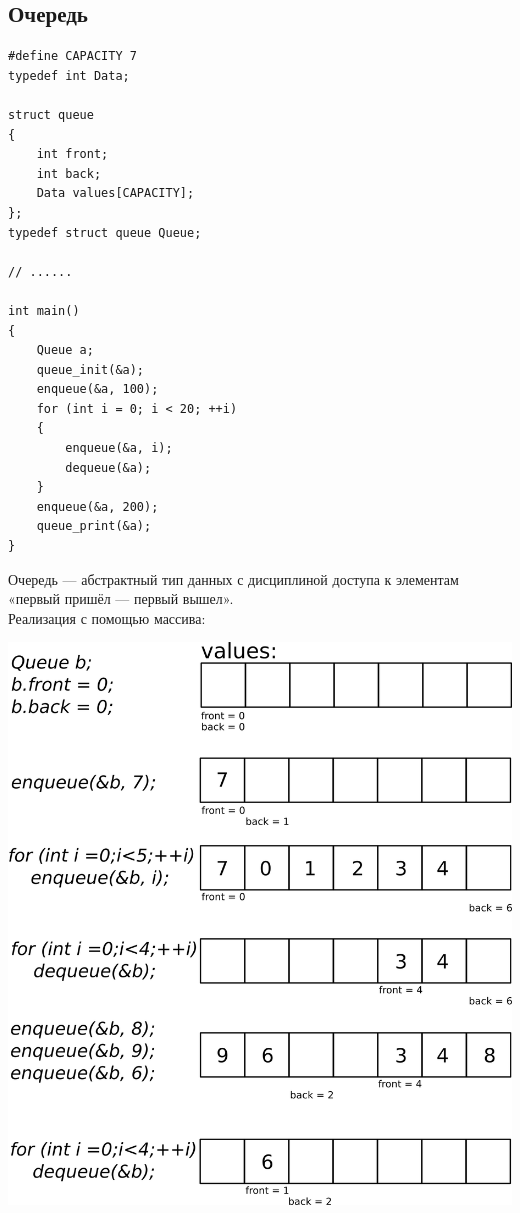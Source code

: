 \documentclass{article}
\begin{document}
\subsection{Очередь}
\begin{multicols}{2}
\begin{lstlisting}
#define CAPACITY 7
typedef int Data;

struct queue
{
    int front;
    int back;
    Data values[CAPACITY];
};
typedef struct queue Queue;

// ......

int main()
{
    Queue a;
    queue_init(&a);
    enqueue(&a, 100);
    for (int i = 0; i < 20; ++i)
    {
        enqueue(&a, i);
        dequeue(&a);
    }
    enqueue(&a, 200);
    queue_print(&a);
}
\end{lstlisting}
\vfill\null
Очередь — абстрактный тип данных с дисциплиной доступа к элементам «первый пришёл — первый вышел». \\
Реализация с помощью массива:
\begin{center}
\includegraphics[width=1.05\linewidth]{../images/queue.png}
\end{center}
\end{multicols}
\end{document}
